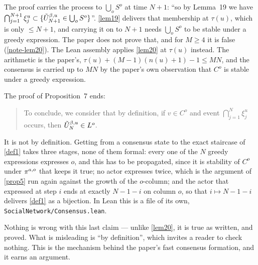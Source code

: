 \begin{remark}
  \label{note-prop7}
  The proof carries the process to $\bigcup_o S^o$ at time $N+1$: ``so by
  Lemma~19 we have $\bigcap_{j=1}^{N+1}\xi_j^u \subset \{\tilde{U}^{\beta,u}_{N+1} \in
  \bigcup_o S^o\}$''.  \ref{lem19} delivers that membership at $\tau(u)$, which
  is only $\le N+1$, and carrying it on to $N+1$ needs $\bigcup_o S^o$ to be
  stable under a greedy expression.  The paper does not prove that, and for $M
  \ge 4$ it is false (\ref{note-lem20}).  The Lean assembly applies \ref{lem20}
  at $\tau(u)$ instead.  The arithmetic is the paper's, $\tau(u) +
  (M-1)(n(u)+1) - 1 \le MN$, and the consensus is carried up to $MN$ by the
  paper's own observation that $C^o$ is stable under a greedy expression.

  The proof of Proposition~7 ends:

  \begin{quote}
    To conclude, we consider that by definition, if $v \in C^o$ and event
    $\bigcap_{j=1}^N \xi_j^u$ occurs, then $\tilde{U}^{\beta,u}_N \in L^o$.
  \end{quote}

  It is not by definition.  Getting from a consensus state to the exact
  staircase of \ref{def1} takes three stages, none of them formal: every one of
  the $N$ greedy expressions expresses $o$, and this has to be propagated,
  since it is stability of $C^o$ under $\pi^{a,o}$ that keeps it true; no
  actor expresses twice, which is the argument of \ref{prop5} run again against
  the growth of the $o$-column; and the actor that expressed at step $i$ ends
  at exactly $N-1-i$ on column $o$, so that $i \mapsto N-1-i$ delivers
  \ref{def1} as a bijection.  In Lean this is a file of its own,
  \texttt{SocialNetwork/Consensus.lean}.

  Nothing is wrong with this last claim --- unlike \ref{lem20}, it is
  true as written, and proved.  What is misleading is ``by definition'',
  which invites a reader to check nothing.  This is the mechanism behind the
  paper's fast consensus formation, and it earns an argument.
\end{remark}

